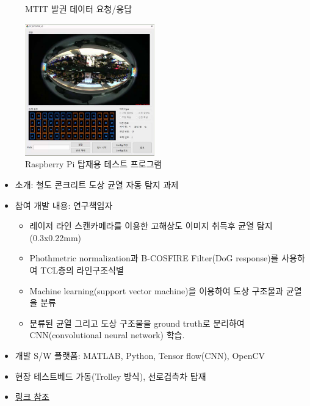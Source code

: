 \documentclass[10pt,a4paper,ragged2e]{altacv}
\begin{document}
\begin{fullwidth}
\begin{figure}[!ht]
\begin{fullwidth}
{    \caption*{MTIT 발권 데이터 요청/응답}
    }\qquad
    \parbox{0.5\textwidth}{
    \centering
    \includegraphics[width=0.5\textwidth]{images/korail_seat_02.jpg}
    \caption*{Raspberry Pi 탑재용 테스트 프로그램}
    }
  \end{fullwidth}
\end{figure}

\divider


\begin{itemize}
\item 소개: 철도 콘크리트 도상 균열 자동 탐지 과제
\item 참여 개발 내용: 연구책임자
  \begin{itemize}
    \item 레이저 라인 스캔카메라를 이용한 고해상도 이미지 취득후 균열 탐지 (0.3x0.22mm)
    \item Phothmetric normalization과 B-COSFIRE Filter(DoG response)를 사용하여 TCL층의 라인구조식별
    \item Machine learning(support vector machine)을 이용하여 도상 구조물과 균열을 분류
    \item 분류된 균열 그리고 도상 구조물을 ground truth로 분리하여 CNN(convolutional neural network) 학습.
  \end{itemize}
\item 개발 S/W 플랫폼: MATLAB, Python, Tensor flow(CNN), OpenCV
\item 현장 테스트베드 가동(Trolley 방식), 선로검측차 탑재
\item \href{https://eunchurn.com/engineering/2017/12/30/concrete-cracks-detection-using-b-cosfire-filter.html}{링크 참조}
\end{itemize}


\end{fullwidth}
\end{document}
